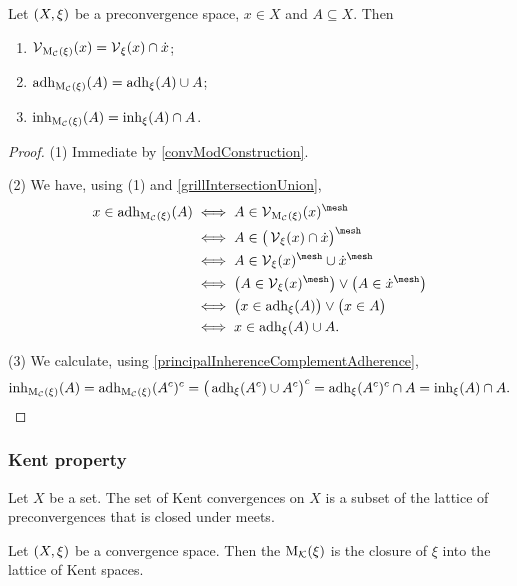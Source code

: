 \begin{proposition} \label{vicinitiesConvergenceModification}
Let $\sSet{X,\xi}$ be a preconvergence space, $x\in X$ and $A\subseteq X$. Then
\begin{enumerate}
\item $\operatorname{\mathcal{V}}_{\operatorname{M_\mathcal{C}}(\xi)}(x) = \operatorname{\mathcal{V}}_{\xi}(x)\cap \dot{x}$;
\item $\operatorname{adh}_{\operatorname{M_\mathcal{C}}(\xi)}(A) = \operatorname{adh}_\xi(A) \cup A$;
\item $\operatorname{inh}_{\operatorname{M_\mathcal{C}}(\xi)}(A) = \operatorname{inh}_\xi(A) \cap A$.
\end{enumerate}
\end{proposition}
\begin{proof}
(1) Immediate by \ref{convModConstruction}.

(2) We have, using (1) and \ref{grillIntersectionUnion},
\begin{align*}
x\in \adh_{\convMod(\xi)}(A) &\iff A\in \vicinities_{\convMod(\xi)}(x)^\mesh \\
&\iff A\in \big(\vicinities_{\xi}(x) \cap \pfilter{x}\big)^\mesh \\
&\iff A\in \vicinities_{\xi}(x)^\mesh \cup \pfilter{x}^\mesh \\
&\iff \big(A\in \vicinities_{\xi}(x)^\mesh\big) \lor \big(A\in \pfilter{x}^\mesh\big) \\
&\iff \big(x\in \adh_\xi(A)\big) \lor \big(x\in A\big) \\
&\iff x \in \adh_\xi(A) \cup A.
\end{align*}

(3) We calculate, using \ref{principalInherenceComplementAdherence},
\[ \operatorname{inh}_{\operatorname{M_\mathcal{C}}(\xi)}(A) = \operatorname{adh}_{\operatorname{M_\mathcal{C}}(\xi)}(A^c)^c = \big(\operatorname{adh}_\xi(A^c)\cup A^c\big)^c = \operatorname{adh}_\xi(A^c)^c \cap A = \operatorname{inh}_\xi(A) \cap A. \]
\end{proof}

\subsubsection{Kent property}
\begin{lemma}
Let $X$ be a set. The set of Kent convergences on $X$ is a subset of the lattice of preconvergences that is closed under meets.
\end{lemma}
\begin{definition}
Let $\sSet{X,\xi}$ be a convergence space. Then the  $\operatorname{M_\mathcal{K}}(\xi)$ is the closure of $\xi$ into the lattice of Kent spaces.
\end{definition}


